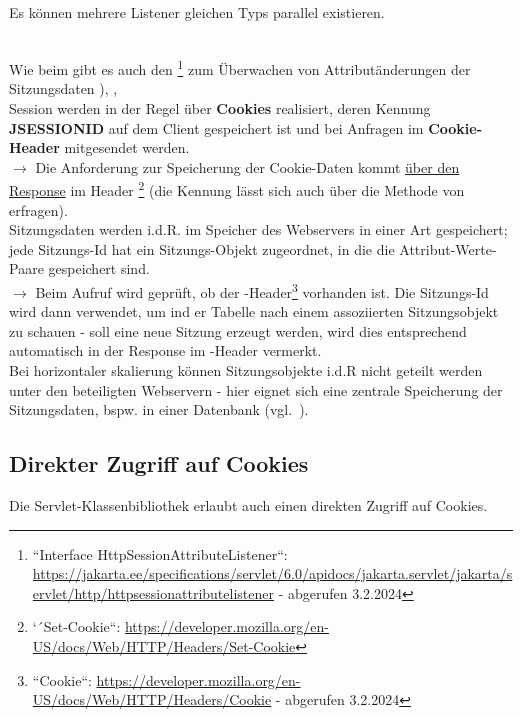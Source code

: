 \begin{tcolorbox}
Es können mehrere Listener gleichen Typs parallel existieren.
\end{tcolorbox}\\

\noindent
Wie beim   gibt es auch den \footnote{``Interface HttpSessionAttributeListener``: \url{https://jakarta.ee/specifications/servlet/6.0/apidocs/jakarta.servlet/jakarta/servlet/http/httpsessionattributelistener} - abgerufen 3.2.2024
} zum Überwachen von Attributänderungen der Sitzungsdaten ), , \\

\noindent
Session werden in der Regel über \textbf{Cookies} realisiert, deren Kennung \textbf{JSESSIONID} auf dem Client gespeichert ist und bei Anfragen im \textbf{Cookie-Header} mitgesendet werden.\\
$\rightarrow$ Die Anforderung zur Speicherung der Cookie-Daten kommt \ul{über den Response} im Header \footnote{
    `´Set-Cookie``: \url{https://developer.mozilla.org/en-US/docs/Web/HTTP/Headers/Set-Cookie}
} (die Kennung lässt sich auch über die Methode  von  erfragen).\\

\noindent
Sitzungsdaten werden i.d.R. im Speicher des Webservers in einer Art  gespeichert; jede Sitzungs-Id hat ein Sitzungs-Objekt zugeordnet, in die die Attribut-Werte-Paare gespeichert sind.\\

$\rightarrow$ Beim Aufruf  wird geprüft, ob der -Header\footnote{
    ``Cookie``: \url{https://developer.mozilla.org/en-US/docs/Web/HTTP/Headers/Cookie} - abgerufen 3.2.2024
} vorhanden ist.
Die Sitzungs-Id wird dann verwendet, um ind er Tabelle nach einem assoziierten Sitzungsobjekt zu schauen - soll eine neue Sitzung erzeugt werden, wird dies entsprechend automatisch in der Response im -Header vermerkt.\\

\noindent
Bei horizontaler skalierung können Sitzungsobjekte i.d.R nicht geteilt werden unter den beteiligten Webservern - hier eignet sich eine zentrale Speicherung der Sitzungsdaten, bspw. in einer Datenbank (vgl.~\cite[433]{Oec22}).

\subsection{Direkter Zugriff auf Cookies}
Die Servlet-Klassenbibliothek erlaubt auch einen direkten Zugriff auf Cookies.\\

